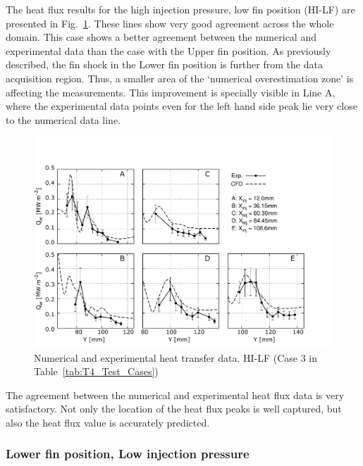\documentclass{AIAA}
\begin{document}
The heat flux results for the high injection pressure, low fin position (HI-LF) are presented in Fig.~\ref{fig:HeatFluxLPHILF}.
These lines show very good agreement across the whole domain. This case shows a better agreement between the numerical and experimental data than the case with the Upper fin position. As previously described, the fin shock in the Lower fin position is further from the data acquisition region. Thus, a smaller area of the `numerical overestimation zone' is affecting the measurements. This improvement is specially visible in Line A, where the experimental data points even for the left hand side peak lie very close to the numerical data line.
%
\begin{figure}[!h]
\center
\includegraphics[trim = 0mm 3mm 25mm 25mm, clip, width=0.60\columnwidth,valign=t,fbox]{Figures/Data/LP_HI_LF/GNUP_CFD_GaugesLines_Multi.pdf}
\caption{Numerical and experimental heat transfer data. HI-LF (Case 3 in Table~\ref{tab:T4_Test_Cases})}
\label{fig:HeatFluxLPHILF}
\end{figure} 

The agreement between the numerical and experimental heat flux data is very satisfactory. Not only the location of the heat flux peaks is well captured, but also the heat flux value is accurately predicted. 

 
\subsubsection{Lower fin position, Low injection pressure}
 
\end{document}
